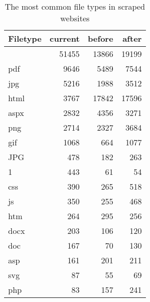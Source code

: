 \begin{table}[ht]
	\centering
	\begin{tabular}{lrrr}
		\hline
		Filetype & current & before & after \\
		\hline
		& 51455 & 13866 & 19199 \\
		pdf & 9646 & 5489 & 7544 \\
		jpg & 5216 & 1988 & 3512 \\
		html & 3767 & 17842 & 17596 \\
		aspx & 2832 & 4356 & 3271 \\
		png & 2714 & 2327 & 3684 \\
		gif & 1068 & 664 & 1077 \\
		JPG & 478 & 182 & 263 \\
		1 & 443 &  61 &  54 \\
		css & 390 & 265 & 518 \\
		js & 350 & 255 & 468 \\
		htm & 264 & 295 & 256 \\
		docx & 203 & 106 & 120 \\
		doc & 167 &  70 & 130 \\
		asp & 161 & 201 & 211 \\
		svg &  87 &  55 &  69 \\
		php &  83 & 157 & 241 \\
		\hline
	\end{tabular}
	\caption{The most common file types in scraped websites}
\end{table}
